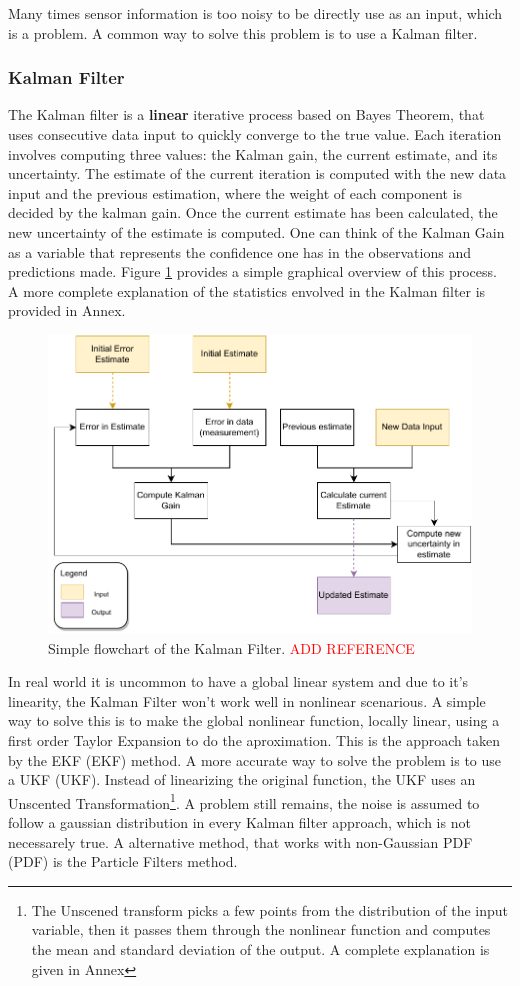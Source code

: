 Many times sensor information is too noisy to be directly use as an input, which is a problem. A common way to solve this problem is to use a Kalman filter.

\subsubsection{Kalman Filter}
The Kalman filter is a \textbf{linear} iterative process based on Bayes Theorem, that uses consecutive data input to quickly converge to the true value. Each iteration involves computing three values: the Kalman gain, the current estimate, and its uncertainty. The estimate of the current iteration is computed with the new data input and the previous estimation, where the weight of each component is decided by the kalman gain. Once the current estimate has been calculated, the new uncertainty of the estimate is computed. One can think of the Kalman Gain as a variable that represents the confidence one has in the observations and predictions made. Figure \ref*{fig: flowchart kalman} provides a simple graphical overview of this process. A more complete explanation of the statistics envolved in the Kalman filter is provided in Annex. 

\begin{figure}[H]
    \centering
    \includegraphics[width=0.5\linewidth]{images/background/Kalman-diagram.pdf}
    \caption{Simple flowchart of the Kalman Filter. \textcolor{red}{ADD REFERENCE}}
    \label{fig: flowchart kalman}
\end{figure}

In real world it is uncommon to have a global linear system and due to it's linearity, the Kalman Filter won't work well in nonlinear scenarious. A simple way to solve this is to make the global nonlinear function, locally linear, using a first order Taylor Expansion to do the aproximation. This is the approach taken by the \acl{EKF} (\acs*{EKF}) method. A more accurate way to solve the problem is to use a \acl*{UKF} (\acs*{UKF}). Instead of linearizing the original function, the \acs*{UKF} uses an Unscented Transformation\footnote{The Unscened transform picks a few points from the distribution of the input variable, then it passes them through the nonlinear function and computes the mean and standard deviation of the output. A complete explanation is given in Annex}. A problem still remains, the noise is assumed to follow a gaussian distribution in every Kalman filter approach, which is not necessarely true. A alternative method, that works with non-Gaussian \acl*{PDF} (\acs*{PDF}) is the Particle Filters method.

